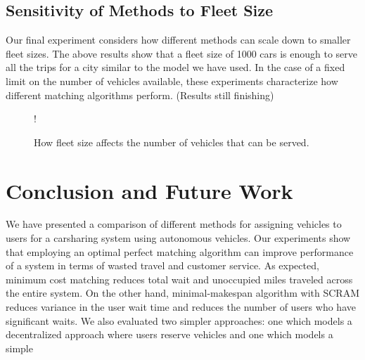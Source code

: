 \documentclass[letterpaper]{article}
\begin{document}
\subsection{Sensitivity of Methods to Fleet Size}

Our final experiment considers how different methods can scale down to smaller fleet sizes. The above results show that a fleet size of 1000 cars is enough to serve all the trips for a city similar to the model we have used. In the case of a fixed limit on the number of vehicles available, these experiments characterize how different matching algorithms perform. (Results still finishing)

\begin{figure}
\resizebox {\columnwidth} {!} {
}
\label{fleetSizeGraph}
\caption{How fleet size affects the number of vehicles that can be served.}
\end{figure}

\section{Conclusion and Future Work}

We have presented a comparison of different methods for assigning vehicles to users for a carsharing system using autonomous vehicles. Our experiments show that employing an optimal perfect matching algorithm can improve performance of a system in terms of wasted travel and customer service. As expected, minimum cost matching reduces total wait and unoccupied miles traveled across the entire system. On the other hand, minimal-makespan algorithm with SCRAM reduces variance in the user wait time and reduces the number of users who have significant waits. We also evaluated two simpler approaches: one which models a decentralized approach where users reserve vehicles and one which models a simple
\end{document}
